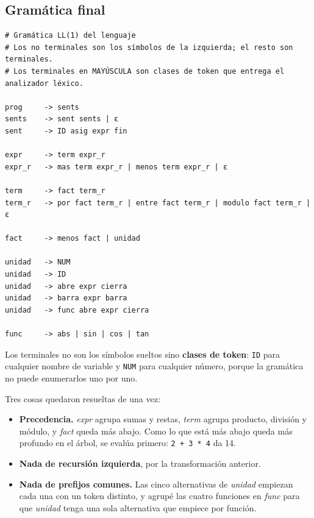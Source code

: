 \documentclass[12pt,letterpaper]{article}
\newcommand{\tk}[1]{\texttt{#1}}
\newcommand{\nt}[1]{\textit{#1}}
\begin{document}
\subsection{Gramática final}

\noindent\begin{minipage}{\linewidth}
\begin{lstlisting}[caption={\texttt{grammars/lenguaje.txt}.}]
# Gramática LL(1) del lenguaje
# Los no terminales son los símbolos de la izquierda; el resto son terminales.
# Los terminales en MAYÚSCULA son clases de token que entrega el analizador léxico.

prog     -> sents
sents    -> sent sents | ε
sent     -> ID asig expr fin

expr     -> term expr_r
expr_r   -> mas term expr_r | menos term expr_r | ε

term     -> fact term_r
term_r   -> por fact term_r | entre fact term_r | modulo fact term_r | ε

fact     -> menos fact | unidad

unidad   -> NUM
unidad   -> ID
unidad   -> abre expr cierra
unidad   -> barra expr barra
unidad   -> func abre expr cierra

func     -> abs | sin | cos | tan
\end{lstlisting}
\end{minipage}

Los terminales no son los símbolos sueltos sino \textbf{clases de token}: \tk{ID} para cualquier nombre de variable y \tk{NUM} para cualquier número, porque la gramática no puede enumerarlos uno por uno.

Tres cosas quedaron resueltas de una vez:

\begin{itemize}
  \item \textbf{Precedencia.} \nt{expr} agrupa sumas y restas, \nt{term} agrupa producto, división y módulo, y \nt{fact} queda más abajo. Como lo que está más abajo queda más profundo en el árbol, se evalúa primero: \tk{2 + 3 * 4} da 14.
  \item \textbf{Nada de recursión izquierda}, por la transformación anterior.
  \item \textbf{Nada de prefijos comunes.} Las cinco alternativas de \nt{unidad} empiezan cada una con un token distinto, y agrupé las cuatro funciones en \nt{func} para que \nt{unidad} tenga una sola alternativa que empiece por función.
\end{itemize}

\end{document}
